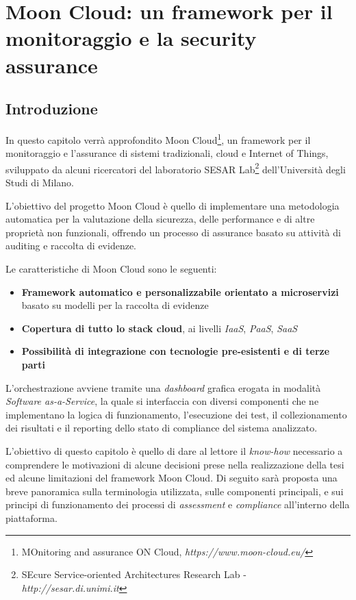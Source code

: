 \documentclass[../main.tex]{subfiles}
\begin{document}
\chapter{Moon Cloud: un framework per il monitoraggio e la security assurance}
\section{Introduzione}
In questo capitolo verrà approfondito Moon Cloud\footnote{MOnitoring and assurance ON Cloud, \textit{https://www.moon-cloud.eu/}}, un framework per il monitoraggio e l'assurance di sistemi tradizionali, cloud e Internet of Things, sviluppato da alcuni ricercatori del laboratorio SESAR Lab\footnote{SEcure Service-oriented Architectures Research Lab - \textit{http://sesar.di.unimi.it}} dell'Università degli Studi di Milano.

L'obiettivo del progetto Moon Cloud è quello di implementare una metodologia automatica per la valutazione della sicurezza, delle performance e di altre proprietà non funzionali, offrendo un processo di assurance basato su attività di auditing e raccolta di evidenze.

Le caratteristiche di Moon Cloud sono le seguenti\cite{MoonCloudWebsite}:
\begin{itemize}
    \item \textbf{Framework automatico e personalizzabile orientato a microservizi} basato su modelli per la raccolta di evidenze
    \item \textbf{Copertura di tutto lo stack cloud}, ai livelli \textit{IaaS}, \textit{PaaS}, \textit{SaaS}
    \item \textbf{Possibilità di integrazione con tecnologie pre-esistenti e di terze parti}
\end{itemize}

L'orchestrazione avviene tramite una  \textit{dashboard} grafica erogata in modalità \textit{Software as-a-Service}, la quale si interfaccia con diversi componenti che ne implementano la logica di funzionamento, l'esecuzione dei test, il collezionamento dei risultati e il reporting dello stato di compliance del sistema analizzato.

L'obiettivo di questo capitolo è quello di dare al lettore il \textit{know-how} necessario a comprendere le motivazioni di alcune decisioni prese nella realizzazione della tesi ed alcune limitazioni del framework Moon Cloud. 
Di seguito sarà proposta una breve panoramica sulla terminologia utilizzata, sulle componenti principali,  e sui principi di funzionamento dei processi di \textit{assessment} e \textit{compliance} all'interno della piattaforma.
\end{document}
